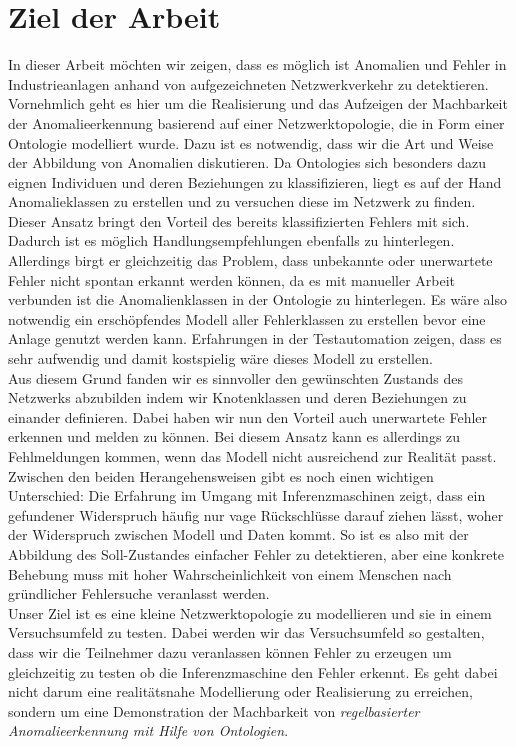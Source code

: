 \chapter{Ziel der Arbeit}
In dieser Arbeit möchten wir zeigen, dass es möglich ist Anomalien und Fehler in Industrieanlagen anhand von aufgezeichneten Netzwerkverkehr zu detektieren. Vornehmlich geht es hier um die Realisierung und das Aufzeigen der Machbarkeit der Anomalieerkennung basierend auf einer Netzwerktopologie, die in Form einer Ontologie modelliert wurde. Dazu ist es notwendig, dass wir die Art und Weise der Abbildung von Anomalien diskutieren. Da \Glspl{Ontologie} sich besonders dazu eignen Individuen und deren Beziehungen zu klassifizieren, liegt es auf der Hand Anomalieklassen zu erstellen und zu versuchen diese im Netzwerk zu finden. Dieser Ansatz bringt den Vorteil des bereits klassifizierten Fehlers mit sich. Dadurch ist es möglich Handlungsempfehlungen ebenfalls zu hinterlegen. Allerdings birgt er gleichzeitig das Problem, dass unbekannte oder unerwartete Fehler nicht spontan erkannt werden können, da es mit manueller Arbeit verbunden ist die Anomalienklassen in der \Gls{Ontologie} zu hinterlegen. Es wäre also notwendig ein erschöpfendes Modell aller Fehlerklassen zu erstellen bevor eine Anlage genutzt werden kann. Erfahrungen in der Testautomation zeigen, dass es sehr aufwendig und damit kostspielig wäre dieses Modell zu erstellen.\\
Aus diesem Grund fanden wir es sinnvoller den gewünschten Zustands des Netzwerks abzubilden indem wir Knotenklassen und deren Beziehungen zu einander definieren. Dabei haben wir nun den Vorteil auch unerwartete Fehler erkennen und melden zu können. Bei diesem Ansatz kann es allerdings zu Fehlmeldungen kommen, wenn das Modell nicht ausreichend zur Realität passt. Zwischen den beiden Herangehensweisen gibt es noch einen wichtigen Unterschied: Die Erfahrung im Umgang mit Inferenzmaschinen zeigt, dass ein gefundener Widerspruch häufig nur vage Rückschlüsse darauf ziehen lässt, woher der Widerspruch zwischen Modell und Daten kommt. So ist es also mit der Abbildung des Soll-Zustandes einfacher Fehler zu detektieren, aber eine konkrete Behebung muss mit hoher Wahrscheinlichkeit von einem Menschen nach gründlicher Fehlersuche veranlasst werden.\\
Unser Ziel ist es eine kleine Netzwerktopologie zu modellieren und sie in einem Versuchsumfeld zu testen. Dabei werden wir das Versuchsumfeld so gestalten, dass wir die Teilnehmer dazu veranlassen können Fehler zu erzeugen um gleichzeitig zu testen ob die Inferenzmaschine den Fehler erkennt. Es geht dabei nicht darum eine realitätsnahe Modellierung oder Realisierung zu erreichen, sondern um eine Demonstration der Machbarkeit von \textit{regelbasierter Anomalieerkennung mit Hilfe von Ontologien}.

